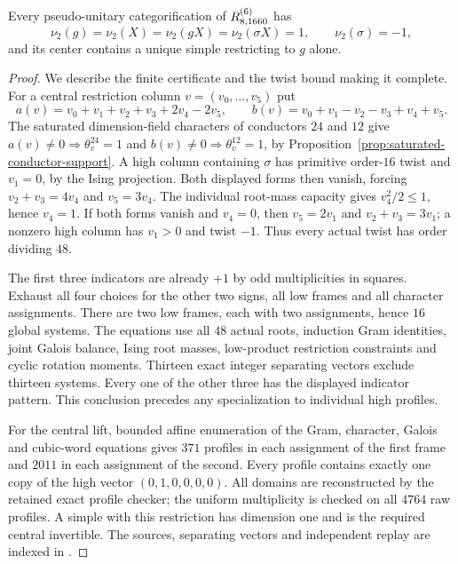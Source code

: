 \begin{proposition}
\label{prop:1660-uniform-indicators}
Every pseudo-unitary categorification of $R^{(6)}_{8,1660}$ has
\[
 \nu_2(g)=\nu_2(X)=\nu_2(gX)=\nu_2(\sigma X)=1,
 \qquad\nu_2(\sigma)=-1,
\]
and its center contains a unique simple restricting to $g$ alone.
\end{proposition}
\begin{proof}
We describe the finite certificate and the twist bound making it complete.
For a central restriction column $v=(v_0,\ldots,v_5)$ put
\[
 a(v)=v_0+v_1+v_2+v_3+2v_4-2v_5,
 \qquad b(v)=v_0+v_1-v_2-v_3+v_4+v_5.
\]
The saturated dimension-field characters of conductors $24$ and $12$
give $a(v)\ne0\Rightarrow\theta_v^{24}=1$ and
$b(v)\ne0\Rightarrow\theta_v^{12}=1$, by
Proposition~\ref{prop:saturated-conductor-support}.
A high column containing $\sigma$ has primitive order-$16$ twist and
$v_1=0$, by the Ising projection. Both displayed forms then vanish,
forcing $v_2+v_3=4v_4$ and $v_5=3v_4$.
The individual root-mass capacity gives $v_4^2/2\le1$, hence $v_4=1$.
If both forms vanish and $v_4=0$, then $v_5=2v_1$ and
$v_2+v_3=3v_1$; a nonzero high column has $v_1>0$ and twist $-1$.
Thus every actual twist has order dividing $48$.

The first three indicators are already $+1$ by odd multiplicities in
squares. Exhaust all four choices for the other two signs, all low
frames and all character assignments. There are two low frames, each
with two assignments, hence $16$ global systems. The equations use all
$48$ actual roots, induction Gram identities, joint Galois balance,
Ising root masses, low-product restriction constraints and cyclic
rotation moments. Thirteen exact integer separating vectors exclude
thirteen systems. Every one of the other three has the displayed
indicator pattern. This conclusion precedes any specialization to
individual high profiles.

For the central lift, bounded affine enumeration of the Gram, character,
Galois and cubic-word equations gives $371$ profiles in each assignment
of the first frame and $2011$ in each assignment of the second.
Every profile contains exactly one copy of the high vector
$(0,1,0,0,0,0)$. All domains are reconstructed by the retained exact
profile checker; the uniform multiplicity is checked on all $4764$
raw profiles. A simple with this restriction has dimension one and is
the required central invertible. The sources, separating vectors and
independent replay are indexed in
.
\end{proof}

